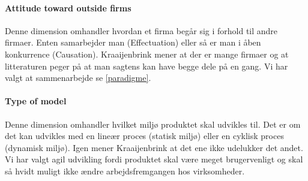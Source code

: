 \paragraph{Attitude toward outside firms}
Denne dimension omhandler hvordan et firma begår sig i forhold til andre firmaer.
Enten samarbejder man (Effectuation) eller så er man i åben konkurrence (Causation).
Kraaijenbrink mener at der er mange firmaer og at litteraturen peger på at man sagtens kan have begge dele på en gang.
Vi har valgt at sammenarbejde se \cref{paradigme}.

\paragraph{Type of model}
Denne dimension omhandler hvilket miljø produktet skal udvikles til.
Det er om det kan udvikles med en lineær proces (statisk miljø) eller en cyklisk proces (dynamisk miljø).
Igen mener Kraaijenbrink at det ene ikke udelukker det andet.
Vi har valgt agil udvikling fordi produktet skal være meget brugervenligt og skal så hvidt muligt ikke ændre arbejdsfremgangen hos virksomheder.
